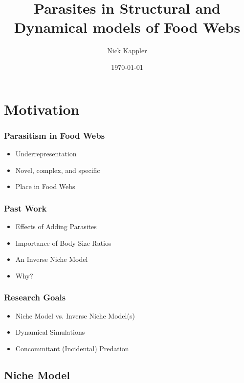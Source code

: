 \documentclass{beamer}
\title{Parasites in Structural and Dynamical models of Food Webs}
\author{Nick Kappler}
\date{\today}
\begin{document}
\frame{\titlepage}

\section[Outline]{}
\frame{\tableofcontents}

\section{Motivation}

\begin{frame}
\frametitle{Parasitism in Food Webs}
\begin{itemize}[<+->]
\item  Underrepresentation
\item  Novel, complex, and specific
\item  Place in Food Webs
\end{itemize}
\end{frame}

\begin{frame}
\frametitle{Past Work}
\begin{itemize}[<+->]
\item  Effects of Adding Parasites %
\item  Importance of Body Size Ratios %
\item  An Inverse Niche Model %
\item  Why?
\end{itemize}
\end{frame}

\begin{frame}
\frametitle{Research Goals}
\begin{itemize}[<+->]
\item Niche Model vs. Inverse Niche Model(s)
\item  Dynamical Simulations
\item  Concommitant (Incidental) Predation
\end{itemize}
\end{frame}


\subsection{Niche Model}
\end{document}
